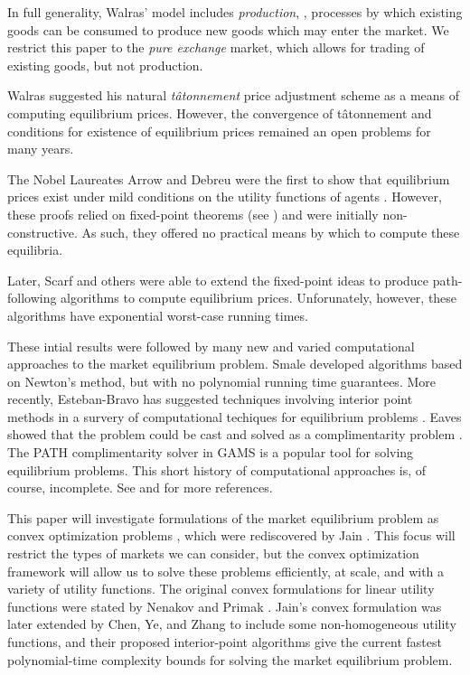 \documentclass[12pt]{article}
\newcommand{\tatonnement}{t\^atonnement}
\begin{document}
In full generality, Walras' model includes \emph{production}, \ie, processes by
which existing goods can be consumed to produce new goods which may enter the
market. We restrict this paper to the \emph{pure exchange} market, which allows for
trading of existing goods, but not production.

Walras suggested his natural \emph{\tatonnement{}} price adjustment scheme as a
means of computing equilibrium prices. However, the convergence of
\tatonnement{} and conditions for existence of equilibrium prices remained an
open problems for many years.

The Nobel Laureates Arrow and Debreu were the first to show that equilibrium
prices exist under mild conditions on the utility functions of agents
\cite{arrow1954existence}. However, these proofs relied on fixed-point theorems
(see \cite{border1989fixed})
and were initially non-constructive.
As such, they offered no practical means by which to compute these equilibria.

Later, Scarf and others 
\cite{scarf1967approximation,scarf1973computation,
scarf1982computation,eaves1972homotopies} were able to extend the fixed-point
ideas to produce path-following algorithms to compute equilibrium prices.
Unforunately, however, these algorithms have exponential worst-case running times.

These intial results were followed by many new and varied computational
approaches to the market equilibrium problem.
Smale \cite{smale1976exchange,smale1976convergent} developed algorithms based
on Newton's method, but with no polynomial running time guarantees.
More recently, Esteban-Bravo has suggested techniques involving
interior point methods in a survery of computational techiques
for equilibrium problems \cite{esteban2004computing}.
Eaves \cite{eaves1976finite} showed that the problem could be cast and solved
as a complimentarity problem \cite{isac1992complementarity}. The PATH
\cite{ferris2008path,ferris2000complementarity,ferris2000homotopy}
complimentarity solver in GAMS \cite{rosenthal2004gams} is a popular tool for
solving equilibrium problems.
This short history of computational approaches is, of course, incomplete.
See \cite{codenotti2008experimental} and \cite{nisan2007algorithmic}
for more references.

This paper will investigate formulations of the market equilibrium problem as
convex optimization problems \cite{BoV:04}, which were rediscovered by Jain
\cite{jain2007polynomial}. This focus will restrict the types of markets we can
consider, but the convex optimization framework will allow us to solve these
problems efficiently, at scale, and with a variety of utility functions. The
original convex formulations for linear utility functions were stated by
Nenakov and Primak \cite{nenakov1983algorithm}. Jain's convex formulation was
later extended by Chen, Ye, and Zhang \cite{chen2007note,
chen2010equilibrium,ye2008path} to include some non-homogeneous utility
functions, and their proposed interior-point algorithms give the current
fastest polynomial-time complexity bounds for solving the market equilibrium
problem.
\end{document}
